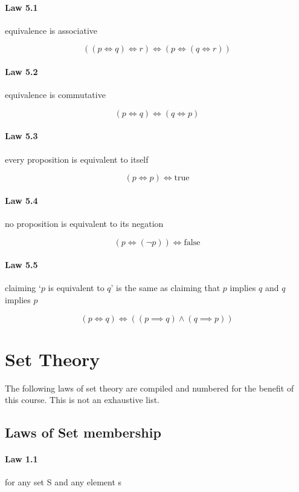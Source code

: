 \documentclass[twocolumn]{article}
\begin{document}
\paragraph{Law 5.1} equivalence is associative

$$ ((p  \iff  q)  \iff  r)  \iff  (p  \iff  (q  \iff  r)) $$

\paragraph{Law 5.2} equivalence is commutative

$$ (p  \iff  q)  \iff  (q  \iff  p) $$

\paragraph{Law 5.3} every proposition is equivalent to itself

$$ (p  \iff  p)  \iff  \text{true} $$

\paragraph{Law 5.4} no proposition is equivalent to its negation

$$ (p  \iff  ( \neg p))  \iff  \text{false} $$

\paragraph{Law 5.5} claiming `$p$ is equivalent to $q$' is the same as claiming that $p$ implies $q$ and $q$ implies $p$

$$ (p  \iff  q)  \iff  ((p  \implies   q)  \wedge  (q  \implies   p)) $$

\clearpage

\section{Set Theory}

The following laws of set theory are compiled and numbered for the benefit of this course. This is not an exhaustive list.

\subsection{Laws of Set membership}

\paragraph{Law 1.1} for any set S and any element s
\end{document}
